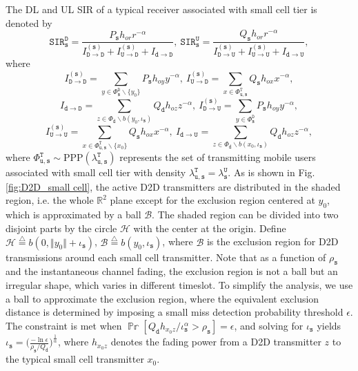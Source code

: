 \documentclass[twocolumn,english]{IEEEtran}
\theoremstyle{plain}
\theoremstyle{definition}
\begin{document}
The DL and UL SIR of a typical receiver associated with small cell
tier is denoted by
\[
\mathtt{SIR}_{\mathtt{s}}^{\mathtt{D}}=\frac{P_{\mathtt{s}}h_{or}r^{-\alpha}}{I_{\mathtt{D\rightarrow D}}^{\mathtt{(s)}}+I_{\mathtt{U\rightarrow D}}^{\mathtt{(s)}}+I_{\mathtt{d\rightarrow D}}},\:\mathtt{SIR}_{\mathtt{s}}^{\mathtt{U}}=\frac{Q_{\mathtt{s}}h_{or}r^{-\alpha}}{I_{\mathtt{D\rightarrow U}}^{\mathtt{(s)}}+I_{\mathtt{U\rightarrow U}}^{\mathtt{(s)}}+I_{\mathtt{d\rightarrow U}}},
\]
\begin{equation}
\label{eq:SIR_small}
\end{equation}
where
\[
I_{\mathtt{D\rightarrow D}}^{\mathtt{(s)}}=\sum_{y\in\Phi_{\mathtt{s}}^{\mathtt{D}}\backslash\{y_{0}\}}P_{\mathtt{s}}h_{oy}y^{-\alpha},\: I_{\mathtt{U\rightarrow D}}^{\mathtt{(s)}}=\sum_{x\in\Phi_{\mathtt{u},\mathtt{s}}^{\mathtt{T}}}Q_{\mathtt{s}}h_{ox}x^{-\alpha},
\]
\[
I_{\mathtt{d\rightarrow D}}=\sum_{z\in\Phi_{\mathtt{d}}\backslash b\left(y_{0},\iota_{\mathtt{s}}\right)}Q_{\mathtt{d}}h_{oz}z^{-\alpha},\: I_{\mathtt{D\rightarrow U}}^{\mathtt{(s)}}=\sum_{y\in\Phi_{\mathtt{s}}^{\mathtt{D}}}P_{\mathtt{s}}h_{oy}y^{-\alpha},
\]
\[
I_{\mathtt{U\rightarrow U}}^{\mathtt{(s)}}=\sum_{x\in\Phi_{\mathtt{u},\mathtt{s}}^{\mathtt{T}}\backslash\{x_{0}\}}Q_{\mathtt{s}}h_{ox}x^{-\alpha},\: I_{\mathtt{d\rightarrow U}}=\sum_{z\in\Phi_{\mathtt{d}}\backslash b\left(x_{0},\iota_{\mathtt{s}}\right)}Q_{\mathtt{d}}h_{oz}z^{-\alpha},
\]
where $\Phi_{\mathtt{u},\mathtt{s}}^{\mathtt{T}}\sim\textrm{PPP}(\lambda_{\mathtt{u,s}}^{\mathtt{T}})$
represents the set of transmitting mobile users associated with small
cell tier with density $\lambda_{\mathtt{u,s}}^{\mathtt{T}}=\lambda_{\mathtt{s}}^{\mathtt{U}}$.
As is shown in Fig. \ref{fig:D2D_small cell}, the active D2D transmitters
are distributed in the shaded region, i.e. the whole $\mathbb{R}^{2}$
plane except for the exclusion region centered at $y_{0}$, which
is approximated by a ball $\mathcal{B}$. The shaded region can be
divided into two disjoint parts by the circle $\mathcal{H}$ with
the center at the origin. Define $\mathcal{H}\overset{\triangle}{=}b\left(0,\Vert y_{0}\Vert+\iota_{\mathtt{s}}\right)$,
$\mathcal{B}\overset{\triangle}{=}b\left(y_{0},\iota_{\mathtt{s}}\right)$,
where $\mathcal{B}$ is the exclusion region for D2D transmissions
around each small cell transmitter. Note that as a function of $\rho_{\mathtt{s}}$
and the instantaneous channel fading, the exclusion region is not
a ball but an irregular shape, which varies in different timeslot.
To simplify the analysis, we use a ball to approximate the exclusion
region, where the equivalent exclusion distance is determined by imposing
a small miss detection probability threshold $\epsilon$. The constraint
is met when $\mathbb{\Pr}[Q_{\mathtt{d}}h_{x_{0}z}/\iota_{\mathtt{s}}^{\alpha}>\rho_{\mathtt{s}}]=\epsilon$,
and solving for $\iota_{\mathtt{s}}$ yields \textbf{$\iota_{\mathtt{s}}=\bigl(\frac{-\ln\epsilon}{\rho_{\mathtt{s}}/Q_{\mathtt{d}}}\bigr)^{\frac{1}{\alpha}}$},
where $h_{x_{0}z}$ denotes the fading power from a D2D transmitter
$z$ to the typical small cell transmitter $x_{0}$.
\end{document}
